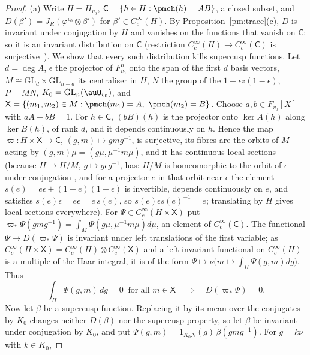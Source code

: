 \documentclass[10pt]{amsart}
\theoremstyle{definition}
\theoremstyle{remark}
\providecommand{\auGL}{\mathrm{GL}}
\begin{document}
\begin{proof}
(a) Write $H=H_{v_0}$, $\mathsf C=\{h\in H:\pmch(h)=AB\}$, a closed subset, and
$D(\beta')=J_R(\varphi^{v_0}\otimes\beta')$ for $\beta'\in C_c^\infty(H)$. By
Proposition~\ref{pm:trace}(c), $D$ is invariant under conjugation by $H$ and vanishes on the
functions that vanish on $\mathsf C$; so it is an invariant distribution on $\mathsf C$
(restriction $C_c^\infty(H)\to C_c^\infty(\mathsf C)$ is surjective~\cite[\S1.8, Proposition]{BZ76}). We show
that every such distribution kills supercusp functions. Let $d=\deg A$, $\epsilon$ the projector
of $F_{v_0}^n$ onto the span of the first $d$ basis vectors, $M\cong\auGL_d\times\auGL_{n-d}$ its
centraliser in $H$, $N$ the group of the $1+\epsilon z(1-\epsilon)$, $P=MN$, $K_0=\auGL_n(
\auO_{v_0})$, and $\mathsf X=\{(m_1,m_2)\in M:\pmch(m_1)=A,\ \pmch(m_2)=B\}$. Choose
$a,b\in F_{v_0}[X]$ with $aA+bB=1$. For $h\in\mathsf C$, $(bB)(h)$ is the projector onto
$\ker A(h)$ along $\ker B(h)$, of rank $d$, and it depends continuously on $h$. Hence the map
$\varpi\colon H\times\mathsf X\to\mathsf C$, $(g,m)\mapsto gmg^{-1}$, is surjective, its fibres are
the orbits of $M$ acting by $(g,m)\mu=(g\mu,\mu^{-1}m\mu)$, and it has continuous local sections
(because $H\to H/M$, $g\mapsto g\epsilon g^{-1}$, has: $H/M$ is homeomorphic to the orbit of
$\epsilon$ under conjugation \cite[\S1.6]{BZ76}, and for a projector $e$ in that orbit near
$\epsilon$ the element $s(e)=e\epsilon+(1-e)(1-\epsilon)$ is invertible, depends continuously on
$e$, and satisfies $s(e)\epsilon=e\epsilon=e\,s(e)$, so $s(e)\epsilon s(e)^{-1}=e$; translating by $H$
gives local sections everywhere). For
$\Psi\in C_c^\infty(H\times\mathsf X)$ put $\varpi_*\Psi(gmg^{-1})=\int_M\Psi(g\mu,\mu^{-1}m\mu)d\mu$,
an element of $C_c^\infty(\mathsf C)$. The functional $\Psi\mapsto D(\varpi_*\Psi)$ is invariant
under left translations of the first variable; as $C_c^\infty(H\times\mathsf X)=C_c^\infty(H)\otimes
C_c^\infty(\mathsf X)$ and a left-invariant functional on $C_c^\infty(H)$ is a multiple of the
Haar integral, it is of the form $\Psi\mapsto\nu\bigl(m\mapsto\int_H\Psi(g,m)dg\bigr)$. Thus
\begin{equation}\label{pm:eq-fibre}
\int_H\Psi(g,m)\,dg=0\ \text{ for all }m\in\mathsf X\quad\Longrightarrow\quad D(\varpi_*\Psi)=0 .
\end{equation}
Now let $\beta$ be a supercusp function. Replacing it by its mean over the conjugates by $K_0$
changes neither $D(\beta)$ nor the supercusp property, so let $\beta$ be invariant under
conjugation by $K_0$, and put $\Psi(g,m)=1_{K_0N}(g)\,\beta(gmg^{-1})$. For $g=k\nu$ with $k\in K_0$,

\end{proof}
\end{document}
